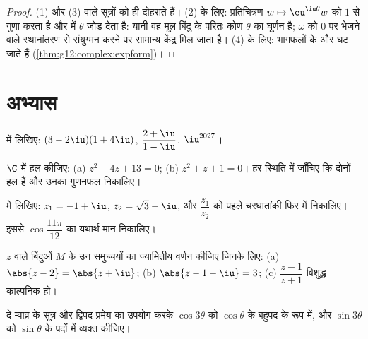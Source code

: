 \begin{proof}
(1) और (3)  वाले सूत्रों को ही दोहराते हैं। (2) के लिए: प्रतिचित्रण
$w \mapsto \eu^{\iu\theta} w$  को $1$ से गुणा करता है और  में $\theta$ जोड़ देता है:
यानी वह मूल बिंदु के परितः कोण $\theta$ का घूर्णन है; $\omega$ को $0$ पर भेजने
वाले स्थानांतरण से संयुग्मन करने पर सामान्य केंद्र मिल जाता है। (4) के लिए:
भागफलों के  और  घट जाते हैं (\cref{thm:g12:complex:expform})।
\end{proof}

\section{अभ्यास}

\begin{exercise}[$\star$]\label{exo:g12:complex:1}
 में लिखिए:
$(3 - 2\iu)(1 + 4\iu)$, \quad $\dfrac{2 + \iu}{1 - \iu}$, \quad $\iu^{2027}$।
\end{exercise}

\begin{exercise}[$\star$]\label{exo:g12:complex:2}
$\C$ में हल कीजिए: (a) $z^2 - 4z + 13 = 0$; (b) $z^2 + z + 1 = 0$। हर स्थिति में जाँचिए कि दोनों हल
 हैं और उनका गुणनफल निकालिए।
\end{exercise}

\begin{exercise}[$\star$]\label{exo:g12:complex:3}
 में लिखिए: $z_1 = -1 + \iu$, $z_2 = \sqrt3 - \iu$, और $\dfrac{z_1}{z_2}$ को पहले चरघातांकी फिर
 में निकालिए। इससे $\cos\dfrac{11\pi}{12}$ का यथार्थ मान निकालिए।
\end{exercise}

\begin{exercise}[$\star\star$]\label{exo:g12:complex:4}
 $z$ वाले बिंदुओं $M$ के उन समुच्चयों का ज्यामितीय वर्णन कीजिए
जिनके लिए:
(a) $\abs{z - 2} = \abs{z + \iu}$;\quad
(b) $\abs{z - 1 - \iu} = 3$;\quad
(c) $\dfrac{z - 1}{z + 1}$ विशुद्ध काल्पनिक हो।
\end{exercise}

\begin{exercise}[$\star\star$]\label{exo:g12:complex:5}
दे म्वाव्र के सूत्र और द्विपद प्रमेय का उपयोग करके $\cos 3\theta$ को $\cos\theta$ के बहुपद के
रूप में, और $\sin 3\theta$ को $\sin\theta$ के पदों में व्यक्त कीजिए।
\end{exercise}


